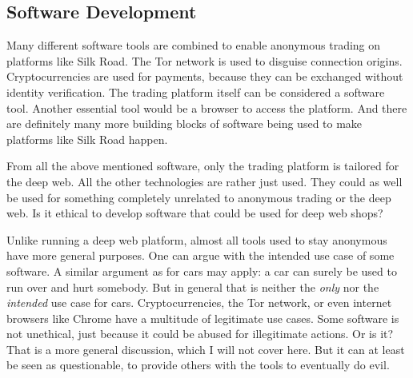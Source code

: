 \subsection{Software Development}

Many different software tools are combined to enable anonymous trading on platforms like Silk Road. The Tor network is used to disguise connection origins. Cryptocurrencies are used for payments, because they can be exchanged without identity verification. The trading platform itself can be considered a software tool. Another essential tool would be a browser to access the platform. And there are definitely many more building blocks of software being used to make platforms like Silk Road happen.

From all the above mentioned software, only the trading platform is tailored for the deep web. All the other technologies are rather just used. They could as well be used for something completely unrelated to anonymous trading or the deep web. Is it ethical to develop software that could be used for deep web shops?

Unlike running a deep web platform, almost all tools used to stay anonymous have more general purposes. One can argue with the intended use case of some software. A similar argument as for cars may apply: a car can surely be used to run over and hurt somebody. But in general that is neither the \emph{only} nor the \emph{intended} use case for cars. Cryptocurrencies, the Tor network, or even internet browsers like Chrome have a multitude of legitimate use cases. Some software is not unethical, just because it could be abused for illegitimate actions. Or is it? That is a more general discussion, which I will not cover here. But it can at least be seen as questionable, to provide others with the tools to eventually do evil.